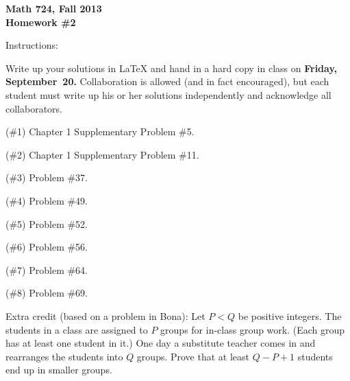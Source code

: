 
\setcounter{exprobno}{0}
\newcommand{\exprob}{\vskip10bp\addtocounter{probno}{1}{\bf(E{\arabic{probno}})}\quad}
\newcommand{\booksection}[1]{\bigskip\hrule\medskip\textbf{#1}}


{\bf Math 724, Fall 2013\\
Homework \#2

Instructions:} Write up your solutions in LaTeX and hand in a hard copy in class on {\bf Friday, September~20.}  Collaboration is allowed (and in fact encouraged), but each student must write up his or her solutions independently and acknowledge all collaborators.

(\#1) Chapter 1 Supplementary Problem \#5.%

(\#2) Chapter 1 Supplementary Problem \#11.%

(\#3) Problem \#37.%

(\#4)  Problem \#49.%

(\#5)  Problem \#52.%

(\#6)  Problem \#56.%

(\#7)  Problem \#64.%

(\#8)  Problem \#69.%

Extra credit (based on a problem in Bona): Let $P<Q$ be positive integers.  The students in a class are assigned to $P$ groups for in-class group work.  (Each group has at least one student in it.)  One day a substitute teacher comes in and rearranges the students into $Q$ groups.  Prove that at least $Q-P+1$ students end up in smaller groups.


